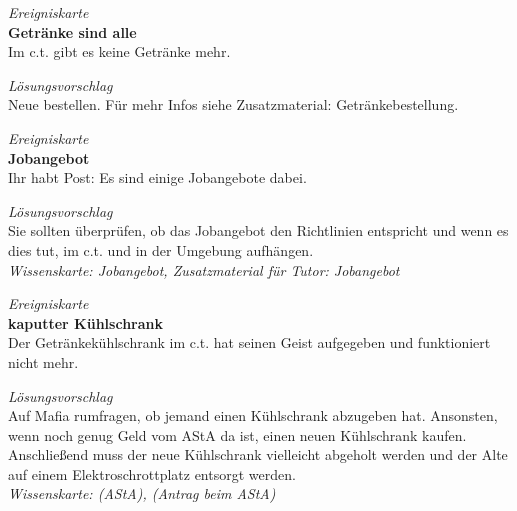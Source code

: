 \documentclass[a4paper,11pt]{scrartcl} %
\begin{document}
\begin{framed}
\textit{Ereigniskarte} \\

\textbf{Getränke sind alle} \\
Im c.t. gibt es keine Getränke mehr.
\end{framed}

\begin{framed}
\textit{Lösungsvorschlag} \\

Neue bestellen.
Für mehr Infos siehe Zusatzmaterial: Getränkebestellung.
\end{framed}

\begin{framed}
\textit{Ereigniskarte} \\

\textbf{Jobangebot} \\
Ihr habt Post: Es sind einige Jobangebote dabei.
\end{framed}

\begin{framed}
\textit{Lösungsvorschlag} \\

Sie sollten überprüfen, ob das Jobangebot den Richtlinien entspricht und
wenn es dies tut, im c.t. und in der Umgebung aufhängen. \\

\textit{Wissenskarte: Jobangebot, Zusatzmaterial für Tutor: Jobangebot}
\end{framed}

\begin{framed}
\textit{Ereigniskarte} \\

\textbf{kaputter Kühlschrank} \\
Der Getränkekühlschrank im c.t. hat seinen Geist aufgegeben und 
funktioniert nicht mehr.
\end{framed}

\begin{framed}
\textit{Lösungsvorschlag} \\

Auf Mafia rumfragen, ob jemand einen Kühlschrank abzugeben hat.
Ansonsten, wenn noch genug Geld vom AStA da ist, einen neuen Kühlschrank kaufen.
Anschließend muss der neue Kühlschrank vielleicht abgeholt werden und der Alte 
auf einem Elektroschrottplatz entsorgt werden. \\

\textit{Wissenskarte: (AStA), (Antrag beim AStA)}
\end{framed}
\end{document}
